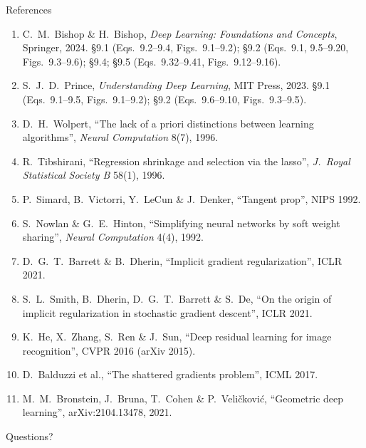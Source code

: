 \documentclass[aspectratio=169, 11pt]{beamer}
\newcommand{\nosrc}{}       %
\begin{document}
\begin{frame}[allowframebreaks]{References}
  \nosrc
  \vspace{0.3em}
  {\scriptsize
  \begin{enumerate}\itemsep0.30em
    \item C.\ M.\ Bishop \& H.\ Bishop, \emph{Deep Learning: Foundations
          and Concepts}, Springer, 2024. \S9.1 (Eqs.~9.2--9.4,
          Figs.~9.1--9.2); \S9.2 (Eqs.~9.1, 9.5--9.20,
          Figs.~9.3--9.6); \S9.4; \S9.5 (Eqs.~9.32--9.41,
          Figs.~9.12--9.16).
    \item S.\ J.\ D.\ Prince, \emph{Understanding Deep Learning}, MIT
          Press, 2023. \S9.1 (Eqs.~9.1--9.5, Figs.~9.1--9.2);
          \S9.2 (Eqs.~9.6--9.10, Figs.~9.3--9.5).
    \item D.\ H.\ Wolpert, ``The lack of a priori distinctions between
          learning algorithms'', \emph{Neural Computation} 8(7), 1996.
    \item R.\ Tibshirani, ``Regression shrinkage and selection via the
          lasso'', \emph{J.\ Royal Statistical Society B} 58(1), 1996.
    \item P.\ Simard, B.\ Victorri, Y.\ LeCun \& J.\ Denker,
          ``Tangent prop'', NIPS 1992.
    \item S.\ Nowlan \& G.\ E.\ Hinton, ``Simplifying neural networks by
          soft weight sharing'', \emph{Neural Computation} 4(4), 1992.
    \item D.\ G.\ T.\ Barrett \& B.\ Dherin, ``Implicit gradient
          regularization'', ICLR 2021.
    \item S.\ L.\ Smith, B.\ Dherin, D.\ G.\ T.\ Barrett \& S.\ De,
          ``On the origin of implicit regularization in stochastic
          gradient descent'', ICLR 2021.
    \item K.\ He, X.\ Zhang, S.\ Ren \& J.\ Sun, ``Deep residual
          learning for image recognition'', CVPR 2016 (arXiv 2015).
    \item D.\ Balduzzi et al., ``The shattered gradients problem'',
          ICML 2017.
    \item M.\ M.\ Bronstein, J.\ Bruna, T.\ Cohen \& P.\ Veli\v{c}kovi\'c,
          ``Geometric deep learning'', arXiv:2104.13478, 2021.
  \end{enumerate}}
\end{frame}

\begin{frame}[standout]
  \nosrc
  Questions?
\end{frame}
\end{document}
